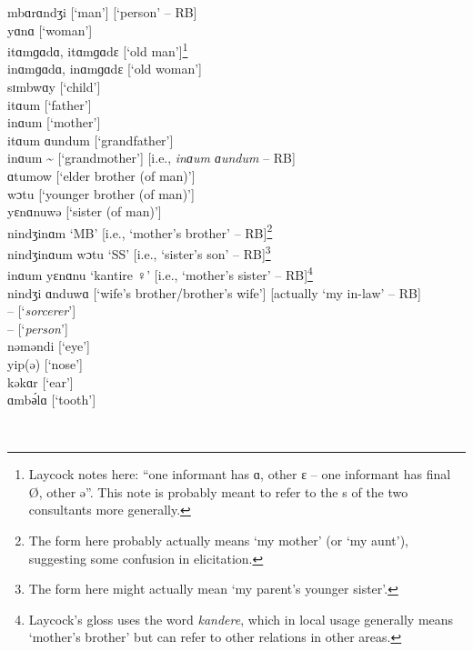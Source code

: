 \noindent mbɑrɑndʒi    [‘man’] [‘person’ -- RB]\\
yɑnɑ      [‘woman’]\\
itɑmɡɑdɑ, itɑmɡɑdɛ  [‘old man’]\footnote{Laycock notes here: “one informant has ɑ, other ɛ – one informant has final Ø, other ə”. This note is probably meant to refer to the s of the two consultants more generally.}\\
inɑmɡɑdɑ, inɑmɡɑdɛ  [‘old woman’]\\
sɪmbwɑy     [‘child’]\\
itɑum       [‘father’]\\
inɑum       [‘mother’]\\
itɑum ɑundum     [‘grandfather’]\\
inɑum {\textasciitilde}     [‘grandmother’] [i.e., \textit{inɑum ɑundum} -- RB]\\
ɑtumow     [‘elder brother (of man)’]\\
wɔtu       [‘younger brother (of man)’]\\
yɛnɑnuwə     [‘sister (of man)’]\\
nindʒinɑm    ‘MB’ [i.e., ‘mother’s brother’ -- RB]\footnote{The form here probably actually means ‘my mother’ (or ‘my aunt’), suggesting some confusion in elicitation.}\\
nindʒinɑum wɔtu  ‘SS’ [i.e., ‘sister’s son’ -- RB]\footnote{The form here might actually mean ‘my parent’s younger sister’.}\\
inɑum yɛnɑnu    ‘kantire ♀’ [i.e., ‘mother’s sister’ -- RB]\footnote{Laycock’s gloss uses the  word \textit{kandere}, which in local usage generally means ‘mother’s brother’ but can refer to other relations in other areas.}\\
nindʒi ɑnduwɑ  [‘wife’s brother/brother’s wife’] [actually ‘my in-law’ -- RB]\\
 --         [‘\textit{sorcerer}’]\\
 --         [‘\textit{person}’]\\
nəməndi    [‘eye’]\\
yip(ə)      [‘nose’]\\
kəkɑr      [‘ear’]\\
ɑmb{\'{ә}l\textlatin{ɑ}}    [‘tooth’]\\



\\


